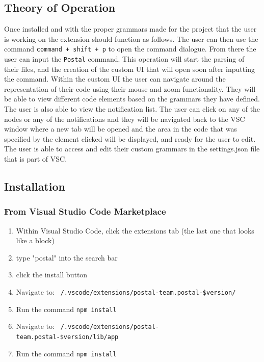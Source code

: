 \documentclass[letterpaper,10pt,titlepage,draftclsnofoot,onecolumn,onesided] {IEEEtran}
\begin{document}
\subsection{Theory of Operation}

Once installed and with the proper grammars made for the project that the user is working on the extension should function as follows. 
The user can then use the command \texttt{command + shift + p} to open the command dialogue.
From there the user can input the \texttt{Postal} command. 
This operation will start the parsing of their files, and the creation of the custom UI that will open soon after inputting the command. 
Within the custom UI the user can navigate around the representation of their code using their mouse and zoom functionality.
They will be able to view different code elements based on the grammars they have defined.
The user is also able to view the notification list. 
The user can click on any of the nodes or any of the notifications and they will be navigated back to the VSC window where a new tab will be opened and the area in the code that was specified by the element clicked will be displayed, and ready for the user to edit.
The user is able to access and edit their custom grammars in the settings.json file that is part of VSC. 


\subsection{Installation}

\subsubsection{From Visual Studio Code Marketplace}
\begin{enumerate}
	\item	Within Visual Studio Code, click the extensions tab (the last one that looks like a block)
	\item 	type "postal" into the search bar
	\item 	click the install button
	\item 	Navigate to: \texttt{~/.vscode/extensions/postal-team.postal-\$version/}
	\item 	Run the command \texttt{npm install}
	\item 	Navigate to: \texttt{~/.vscode/extensions/postal-team.postal-\$version/lib/app}
	\item 	Run the command \texttt{npm install}
\end{enumerate} 
\end{document}

